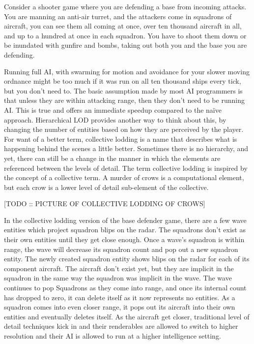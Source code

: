 \documentclass[a4paper,12pt]{article}
\begin{document}
Consider a shooter game where you are defending a base from incoming attacks.
You are manning an anti-air turret, and the attackers come in squadrons of aircraft, you can see them all coming at once, over ten thousand aircraft in all, and up to a hundred at once in each squadron.
You have to shoot them down or be inundated with gunfire and bombs, taking out both you and the base you are defending.

Running full AI, with swarming for motion and avoidance for your slower moving ordnance might be too much if it was run on all ten thousand ships every tick, but you don't need to.
The basic assumption made by most AI programmers is that unless they are within attacking range, then they don't need to be running AI.
This is true and offers an immediate speedup compared to the naïve approach.
Hierarchical LOD provides another way to think about this, by changing the number of entities based on how they are perceived by the player.
For want of a better term, collective lodding is a name that describes what is happening behind the scenes a little better.
Sometimes there is no hierarchy, and yet, there can still be a change in the manner in which the elements are referenced between the levels of detail.
The term collective lodding is inspired by the concept of a collective term.
A murder of crows is a computational element, but each crow is a lower level of detail sub-element of the collective.

[TODO :: PICTURE OF COLLECTIVE LODDING OF CROWS]

In the collective lodding version of the base defender game, there are a few wave entities which project squadron blips on the radar.
The squadrons don't exist as their own entities until they get close enough.
Once a wave's squadron is within range, the wave will decrease its squadron count and pop out a new squadron entity.
The newly created squadron entity shows blips on the radar for each of its component aircraft.
The aircraft don't exist yet, but they are implicit in the squadron in the same way the squadron was implicit in the wave.
The wave continues to pop Squadrons as they come into range, and once its internal count has dropped to zero, it can delete itself as it now represents no entities.
As a squadron comes into even closer range, it pops out its aircraft into their own entities and eventually deletes itself.
As the aircraft get closer, traditional level of detail techniques kick in and their renderables are allowed to switch to higher resolution and their AI is allowed to run at a higher intelligence setting.
\end{document}
